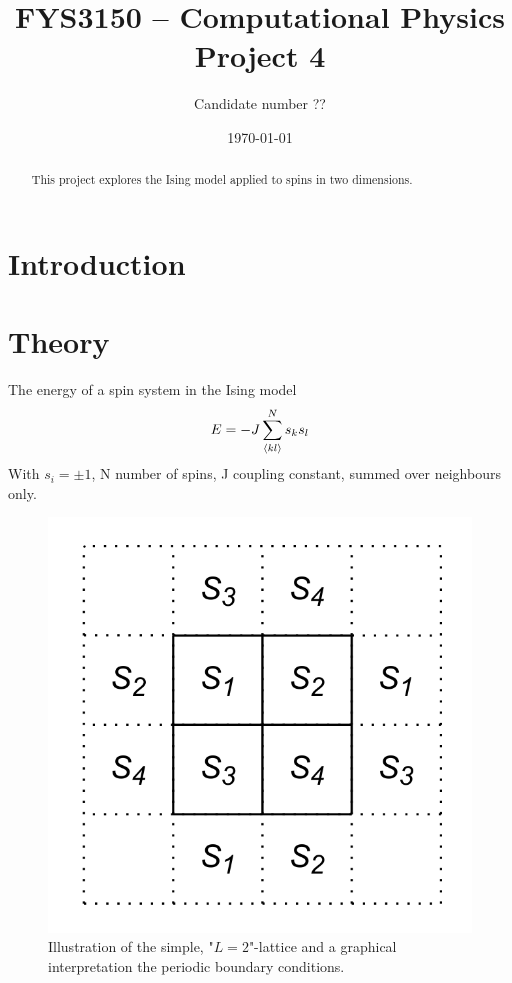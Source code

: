 \documentclass[11pt,a4paper,english,final]{article}
\title{FYS3150 -- Computational Physics\\Project 4}
\author{Candidate number ??}
\date{\today}
\numberwithin{equation}{section}
\begin{document}
\maketitle

\begin{abstract}
This project explores the Ising model applied to spins in two dimensions.
\end{abstract}



\section{Introduction}


\section{Theory}

The energy of a spin system in the Ising model 
\begin{gather}
E = -J\sum_{\expval{kl}}^N s_k s_l
\end{gather}
With $s_i = \pm 1$, N number of spins, J coupling constant, summed over 
neighbours only.

\begin{figure}[H]
\begin{center}
  \includegraphics[scale=0.15]{simple_lattice.png}
  \caption{ Illustration of the simple, "$L=2$"-lattice and a graphical interpretation the periodic boundary conditions.}
  \end{center}
\end{figure}
\end{document}
